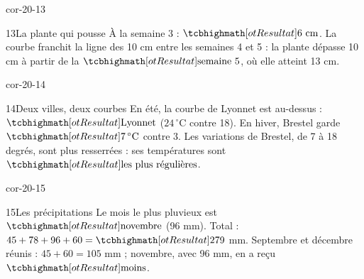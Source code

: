 \begin{blocLivre}{cor-20-13}\begin{corrige}{13}{La plante qui pousse}
À la semaine 3 : $\res{6\ \mathrm{cm}}$. La courbe franchit la ligne des 10 cm entre les semaines 4 et 5 : la plante dépasse 10 cm à partir de la $\res{\text{semaine }5}$, où elle atteint 13 cm.
\label{fig-cor-20-13}
\end{corrige}\end{blocLivre}
\begin{blocLivre}{cor-20-14}\begin{corrige}{14}{Deux villes, deux courbes}
En été, la courbe de Lyonnet est au-dessus : $\res{\text{Lyonnet}}$ ($24\,^\circ$C contre 18). En hiver, Brestel garde $\res{7\,^\circ\mathrm C}$ contre 3. Les variations de Brestel, de 7 à 18 degrés, sont plus resserrées : ses températures sont $\res{\text{les plus régulières}}$.
\label{fig-cor-20-14}
\end{corrige}\end{blocLivre}
\begin{blocLivre}{cor-20-15}\begin{corrige}{15}{Les précipitations}
Le mois le plus pluvieux est $\res{\text{novembre}}$ (96 mm). Total : $45+78+96+60=\res{279}$ mm. Septembre et décembre réunis : $45+60=105$ mm ; novembre, avec 96 mm, en a reçu $\res{\text{moins}}$.
\end{corrige}\end{blocLivre}
